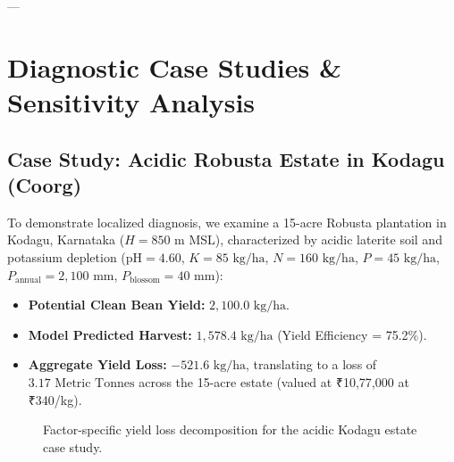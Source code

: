 \documentclass[conference]{IEEEtran}
\begin{document}
---

\section{Diagnostic Case Studies \& Sensitivity Analysis}

\subsection{Case Study: Acidic Robusta Estate in Kodagu (Coorg)}
To demonstrate localized diagnosis, we examine a 15-acre Robusta plantation in Kodagu, Karnataka ($H = 850\text{ m}$ MSL), characterized by acidic laterite soil and potassium depletion ($\text{pH} = 4.60$, $K = 85\text{ kg/ha}$, $N = 160\text{ kg/ha}$, $P = 45\text{ kg/ha}$, $P_{\text{annual}} = 2,100\text{ mm}$, $P_{\text{blossom}} = 40\text{ mm}$):
\begin{itemize}
    \item \textbf{Potential Clean Bean Yield:} $2,100.0\text{ kg/ha}$.
    \item \textbf{Model Predicted Harvest:} $1,578.4\text{ kg/ha}$ (Yield Efficiency = 75.2\%).
    \item \textbf{Aggregate Yield Loss:} $-521.6\text{ kg/ha}$, translating to a loss of $3.17\text{ Metric Tonnes}$ across the 15-acre estate (valued at ₹10,77,000 at ₹340/kg).
\end{itemize}

\begin{figure}[!t]
\centering
{}
\caption{Factor-specific yield loss decomposition for the acidic Kodagu estate case study.}
\label{fig:waterfall}
\end{figure}
\end{document}
